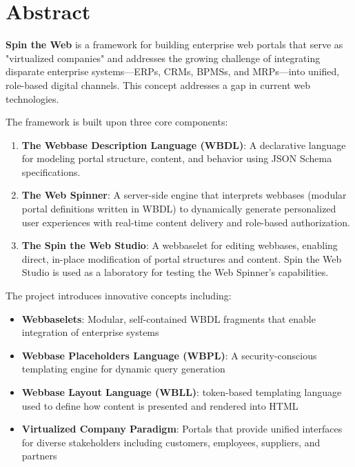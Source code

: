 
\chapter*{Abstract}

\textbf{Spin the Web} is a framework for building enterprise web portals that serve as "virtualized companies" and addresses the growing challenge of integrating disparate enterprise systems—ERPs, CRMs, BPMSs, and MRPs—into unified, role-based digital channels. This concept addresses a gap in current web technologies.

The framework is built upon three core components:

\begin{enumerate}
\item \textbf{The Webbase Description Language (WBDL)}: A declarative language for modeling portal structure, content, and behavior using JSON Schema specifications.

\item \textbf{The Web Spinner}: A server-side engine that interprets webbases (modular portal definitions written in WBDL) to dynamically generate personalized user experiences with real-time content delivery and role-based authorization.

\item \textbf{The Spin the Web Studio}: A webbaselet for editing webbases, enabling direct, in-place modification of portal structures and content. Spin the Web Studio is used as a laboratory for testing the Web Spinner's capabilities.
\end{enumerate}

The project introduces innovative concepts including:
\begin{itemize}
\item \textbf{Webbaselets}: Modular, self-contained WBDL fragments that enable integration of enterprise systems
\item \textbf{Webbase Placeholders Language (WBPL)}: A security-conscious templating engine for dynamic query generation
\item \textbf{Webbase Layout Language (WBLL)}: token-based templating language used to define how content is presented and rendered into HTML
\item \textbf{Virtualized Company Paradigm}: Portals that provide unified interfaces for diverse stakeholders including customers, employees, suppliers, and partners
\end{itemize}

